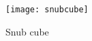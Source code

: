 \documentclass[beamer]{standalone}
\begin{document}
\begin{standaloneframe}
  \begin{center}
    \texttt{[image: snubcube]}
  \end{center}

  \pause

  \begin{center}
    Snub cube
  \end{center}
\end{standaloneframe}
\end{document}
